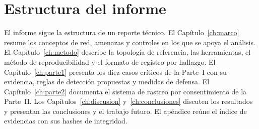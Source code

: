 \section{Estructura del informe}
El informe sigue la estructura de un reporte t\'ecnico. El Cap\'itulo~\ref{ch:marco} resume los conceptos de red, amenazas y controles en los que se apoya el an\'alisis. El Cap\'itulo~\ref{ch:metodo} describe la topolog\'ia de referencia, las herramientas, el m\'etodo de reproducibilidad y el formato de registro por hallazgo. El Cap\'itulo~\ref{ch:parte1} presenta los diez casos cr\'iticos de la Parte~I con su evidencia, reglas de detecci\'on propuestas y medidas de defensa. El Cap\'itulo~\ref{ch:parte2} documenta el sistema de rastreo por consentimiento de la Parte~II. Los Cap\'itulos~\ref{ch:discusion} y~\ref{ch:conclusiones} discuten los resultados y presentan las conclusiones y el trabajo futuro. El ap\'endice re\'une el \'indice de evidencias con sus hashes de integridad.
